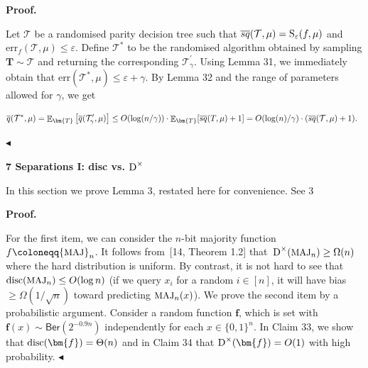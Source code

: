 \par\medskip\noindent\textbf{Proof.}\par




Let $\mathcal{T}$ be a randomised parity decision tree such that $\mathop{\overline{sq}}(\mathcal{T},\mu)={\textup{S}}_{\varepsilon}(f,\mu)$ and $\mathrm{err}_{f}(\mathcal{T},\mu)\leq\varepsilon$. Define $\mathcal{T}^{*}$ to be the randomised algorithm obtained by sampling $\bm{T}\sim\mathcal{T}$ and returning the corresponding $\mathcal{T}^{\prime}_{\gamma}$. Using Lemma 31, we immediately obtain that $\mathrm{err}(\mathcal{T}^{*},\mu)\leq\varepsilon+\gamma$. By Lemma 32 and the range of parameters allowed for $\gamma$, we get\par


\[\begin{gathered}
\overline{q}(\mathcal{T}^{*},\mu)=\mathop{\mathbb{E}}\nolimits_{\bm{T}}\big{[}\overline{q}(\mathcal{T}^{\prime}_{\gamma},\mu)\big{]}\leq O(\log(n/\gamma))\cdot\mathop{\mathbb{E}}\nolimits_{\bm{T}}[\mathop{\overline{sq}}(T,\mu)+1]=O(\log(n)/\gamma)\cdot(\mathop{\overline{sq}}(\mathcal{T},\mu)+1).\ \
\end{gathered}\]


$\blacktriangleleft$\par








\par\medskip\noindent\textbf{
7 Separations I: disc vs. ${\textup{D}}^{\times}$
}\par




In this section we prove Lemma 3, restated here for convenience.
See 3\par




\par\medskip\noindent\textbf{Proof.}\par




For the first item, we can consider the $n$-bit majority function $f\coloneqq{\textrm{\small{MAJ}}}_{n}$. It follows from [14, Theorem 1.2] that ${\textup{D}}^{\times}({\textrm{\small{MAJ}}}_{n})\geq\Omega(n)$ where the hard distribution is uniform. By contrast, it is not hard to see that ${\textup{disc}}({\textrm{\small{MAJ}}}_{n})\leq O(\log n)$ (if we query $x_{i}$ for a random $i\in[n]$, it will have bias $\geq\Omega(1/\sqrt{n})$ toward predicting ${\textrm{\small{MAJ}}}_{n}(x)$). We prove the second item by a probabilistic argument. Consider a random function $\bm{f}$, which is set with $\bm{f}(x)\sim\mathsf{Ber}(2^{-0.9n})$ independently for each $x\in\{0,1\}^{n}$. In Claim 33, we show that ${\textup{disc}}(\bm{f})=\Theta(n)$ and in Claim 34 that ${\textup{D}}^{\times}(\bm{f})=O(1)$ with high probability.
$\blacktriangleleft$\par



